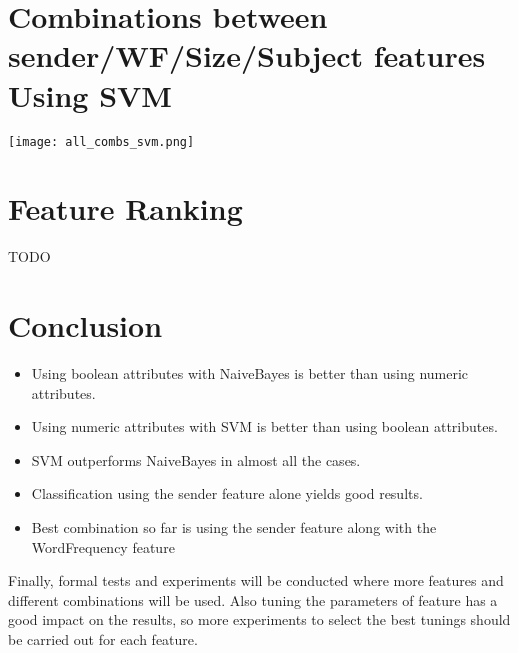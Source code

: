 \section{Combinations between sender/WF/Size/Subject features Using SVM}
\texttt{[image: all\_combs\_svm.png]}


\section{Feature Ranking}
TODO

\section{Conclusion}
\begin{itemize}
\item Using boolean attributes with NaiveBayes is better than using numeric attributes.
\item Using numeric attributes with SVM is better than using boolean attributes.
\item SVM outperforms NaiveBayes in almost all the cases.
\item Classification using the sender feature alone yields good results.
\item Best combination so far is using the sender feature along with the WordFrequency feature
\end{itemize}

Finally, formal tests and experiments will be conducted where more features and different combinations will be used. Also tuning the parameters of feature has a good impact on the results, so more experiments to select the best tunings should be carried out for each feature.

